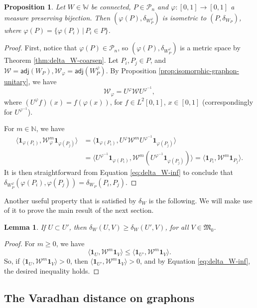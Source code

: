 \documentclass[11pt]{article}
\def\N{\mathbb{N}}
\def\WW{\mathbb{W}}
\def\II{\bm{1}}
\def\calP{\mathcal{P}}
\def\calW{\mathcal{W}}
\def\frakM{\mathfrak{M}_0}
\newcommand{\sans}[1]{\mathsf{#1}}
\def\adj{\sans{adj}}
\newtheorem{lemma}{Lemma}[section]
\newtheorem{proposition}{Proposition}[section]
\theoremstyle{definition}
\begin{document}
\begin{proposition}
    Let $W \in \WW$ be connected, $P\in \calP_n$ and $\varphi : [0,1] \rightarrow [0,1]$ a measure preserving bijection. Then $(\varphi(P), \delta_{W_P^\varphi})$ is isometric to $(P,\delta_{W_P})$, where $\varphi(P) = \{\varphi(P_i) \,|\, P_i \in P\}$.
\end{proposition}
\begin{proof}
    First, notice that $\varphi(P) \in \calP_n$, so $(\varphi(P), \delta_{W_P^\varphi})$ is a metric space by Theorem \ref{thm:delta_W-coarsen}. Let $P_i, P_j \in P$, and $\calW = \adj(W_P), \calW_\varphi = \adj(W_P^\varphi)$. By Proposition \ref{prop:isomorphic-graphon-unitary}, we have
    $$ \calW_\varphi = U^\varphi \calW U^{\varphi^{-1}}, $$
    where $(U^\varphi f)(x) = f(\varphi(x))$, for $f\in L^2 [0,1]$, $x\in [0,1]$ (correspondingly for $U^{\varphi^{-1}}$).

    For $m\in \N$, we have
    \begin{align*}
        \langle \II_{\varphi(P_i)}, \calW_\varphi^m \II_{\varphi(P_j)} \rangle &= \langle \II_{\varphi(P_i)}, U^\varphi \calW^m U^{\varphi^{-1}} \II_{\varphi(P_j)} \rangle\\
        &= \langle U^{\varphi^{-1}} \II_{\varphi(P_i)}, \calW^m (U^{\varphi^{-1}} \II_{\varphi(P_j)}) \rangle = \langle \II_{P_i}, \calW^m \II_{P_j} \rangle.
    \end{align*}
    It is then straightforward from Equation \eqref{eq:delta_W-inf} to conclude that $\delta_{W_P^\varphi} (\varphi(P_i), \varphi(P_j)) = \delta_{W_P} (P_i,P_j)$.
\end{proof}

Another useful property that is satisfied by $\delta_W$ is the following. We will make use of it to prove the main result of the next section.
\begin{lemma} \label{lemma:delta-monotonic}
    If $U \subset U'$, then $\delta_W (U,V) \ge \delta_W (U',V)$, for all $V\in \frakM$.
\end{lemma}
\begin{proof}
    For $m\ge 0$, we have
    $$ \langle \II_{U}, \calW^m \II_V \rangle \le \langle \II_{U'}, \calW^m \II_V \rangle. $$
    So, if $\langle \II_U, \calW^m \II_V \rangle > 0$, then $\langle \II_{U'}, \calW^m \II_V \rangle > 0$, and by Equation \eqref{eq:delta_W-inf}, the desired inequality holds.
\end{proof}

\subsection{The Varadhan distance on graphons} \label{sec:varadhan-pointwise}
\end{document}

